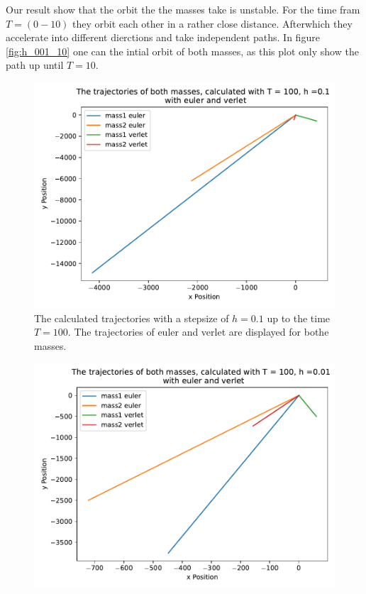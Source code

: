 \begin{itemize}
    Our result show that the orbit the the masses take is unstable.
    For the time fram $T=(0-10)$ they orbit each other in a rather close distance.
    Afterwhich they accelerate into different dierctions and take independent paths.
    In figure \autoref{fig:h_001_10} one can the intial orbit of both masses, as this plot only show the path up until $T=10$.
    \begin{figure}
        \centering
        \includegraphics[width=\textwidth]{plots/plotsT_100_01/plota.pdf}
        \caption{The calculated trajectories with a stepsize of $h=0.1$ up to the time $T=100$.
        The trajectories of euler and verlet are displayed for bothe masses.}
        \label{fig:h_01_100}
    \end{figure}
    \begin{figure}
        \centering
        \includegraphics[width=\textwidth]{plots/plotsT_100_h_001/plota.pdf}

\end{figure}
\end{itemize}

